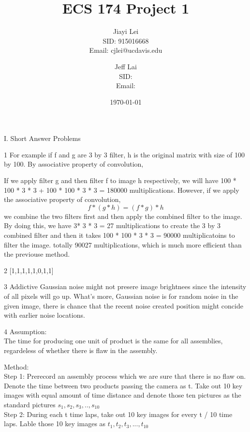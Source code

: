 \documentclass[a4paper,12pt]{article}
\title{ECS 174 Project 1}
\author{
  Jiayi Lei\\
  SID: 915016668\\
  Email: cjlei@ucdavis.edu
  \and
  Jeff Lai\\
  SID: \\
  Email:
}
\date{\today}
\begin{document}
\maketitle
\begin{section}{I. Short Answer Problems}
\begin{subsection}{1}
For example if f and g are 3 by 3 filter, h is the original matrix with size of 100 by 100. By associative property of convolution, 


If we apply filter g and then filter f to image h respectively, we will have 100 * 100 * 3 * 3  + 100 * 100 * 3 * 3  = 180000 multiplications. However, if we apply the associative property of convolution, 
$$ f * (g * h) = (f * g) * h $$
we combine the two filters first and then apply the combined filter to the image. By doing this, we have 3* 3 * 3 = 27 multiplications to create the 3 by 3 combined filter and then it takes 100 * 100 * 3 * 3 = 90000 multiplicatoins to filter the image. totally 90027 multiplications, which is much more efficient than the previouse method. 

\end{subsection}

\begin{subsection}{2}
[1,1,1,1,1,0,1,1]

\end{subsection}

\begin{subsection}{3}
Addictive Gaussian noise might not presere image brightnees since the intensity of all pixels will go up. What's more, Gaussian noise is for random noise in the given image, there is chance that the recent noise created position might concide with earlier noise locations.

\end{subsection}

\begin{subsection}{4}
Assumption:\\
The time for producing one unit of product is the same for all assemblies, regardeless of whether there is flaw in the assembly. 

Method:\\
Step 1: Prerecord an assembly process which we are sure that there is no flaw on. Denote the time between two products passing the camera as t. Take out 10 key images with equal amount of time distance and denote those ten pictures as the standard pictures $s_1,s_2, s_3,..,s_10$\\
Step 2: During each t time laps, take out 10 key images for every t / 10 time laps. Lable those 10 key images as $t_1,t_2,t_3,...,t_10$\\


\end{subsection}
\end{section}
\end{document}

